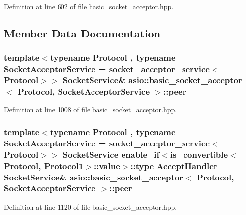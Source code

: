 Definition at line 602 of file basic\+\_\+socket\+\_\+acceptor.\+hpp.



\subsection{Member Data Documentation}
\hypertarget{classasio_1_1basic__socket__acceptor_a140464f59d688d964abf760d11b30f94}{}
\subsubsection[{peer}]{\setlength{\rightskip}{0pt plus 5cm}template$<$typename Protocol , typename Socket\+Acceptor\+Service  = socket\+\_\+acceptor\+\_\+service$<$\+Protocol$>$$>$ Socket\+Service\& {\bf asio\+::basic\+\_\+socket\+\_\+acceptor}$<$ Protocol, Socket\+Acceptor\+Service $>$\+::peer}\label{classasio_1_1basic__socket__acceptor_a140464f59d688d964abf760d11b30f94}


Definition at line 1008 of file basic\+\_\+socket\+\_\+acceptor.\+hpp.

\hypertarget{classasio_1_1basic__socket__acceptor_a30b2ea172c3889eb87ddb8ab5be95c0a}{}
\subsubsection[{peer}]{\setlength{\rightskip}{0pt plus 5cm}template$<$typename Protocol , typename Socket\+Acceptor\+Service  = socket\+\_\+acceptor\+\_\+service$<$\+Protocol$>$$>$ Socket\+Service {\bf enable\+\_\+if}$<$is\+\_\+convertible$<$Protocol, Protocol1$>$\+::value$>$\+::type Accept\+Handler Socket\+Service\& {\bf asio\+::basic\+\_\+socket\+\_\+acceptor}$<$ Protocol, Socket\+Acceptor\+Service $>$\+::peer}\label{classasio_1_1basic__socket__acceptor_a30b2ea172c3889eb87ddb8ab5be95c0a}


Definition at line 1120 of file basic\+\_\+socket\+\_\+acceptor.\+hpp.

\hypertarget{classasio_1_1basic__socket__acceptor_a9d2810f536fb7c7ad036abadb5750ce7}{}
